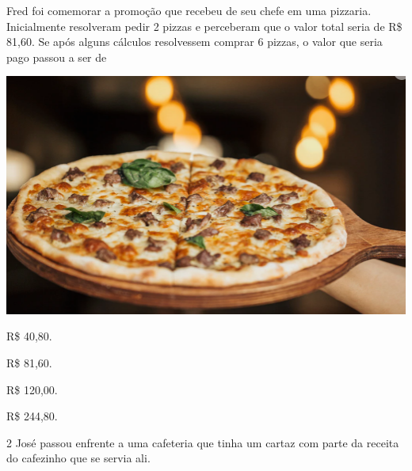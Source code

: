 \begin{minipage}{.5\textwidth}
Fred foi comemorar a promoção que recebeu de seu chefe em uma
pizzaria. Inicialmente resolveram pedir 2 pizzas e perceberam que o
valor total seria de R\$ 81,60. Se após alguns cálculos resolvessem
comprar 6 pizzas, o valor que seria pago passou a ser de 
\end{minipage}\hspace{.5cm}
\begin{minipage}{.5\textwidth}
\includegraphics[width=\textwidth]{./imgs/mat15.png}
\end{minipage}

\begin{minipage}{.5\textwidth}
\begin{escolha}
\item
  R\$ 40,80.
\item
  R\$ 81,60.
\item
  R\$ 120,00.
\item
  R\$ 244,80.
\end{escolha}
\end{minipage}


\num{2} José passou enfrente a uma cafeteria que tinha um cartaz com parte
da receita do cafezinho que se servia ali.

